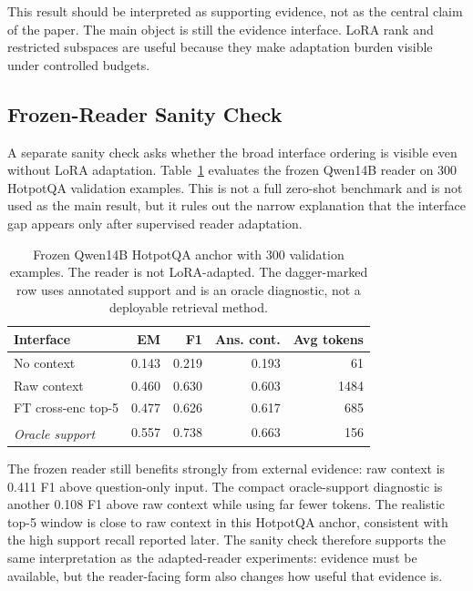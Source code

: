 \documentclass[a4paper,fleqn]{cas-sc}
\newcommand{\diagiface}[1]{\emph{#1}\textsuperscript{\dag}}
\begin{document}
This result should be interpreted as supporting evidence, not as the central
claim of the paper. The main object is still the evidence interface. LoRA rank
and restricted subspaces are useful because they make adaptation burden visible
under controlled budgets.

\subsection{Frozen-Reader Sanity Check}

A separate sanity check asks whether the broad interface ordering is visible
even without LoRA adaptation. Table~\ref{tab:frozen-qwen14b-sanity} evaluates
the frozen Qwen14B reader on 300 HotpotQA validation examples. This is not a
full zero-shot benchmark and is not used as the main result, but it rules out
the narrow explanation that the interface gap appears only after supervised
reader adaptation.

\begin{table}[!t]
\centering
\caption{Frozen Qwen14B HotpotQA anchor with 300 validation examples. The
reader is not LoRA-adapted. The dagger-marked row uses annotated support and is
an oracle diagnostic, not a deployable retrieval method.}
\label{tab:frozen-qwen14b-sanity}
\small
\setlength{\tabcolsep}{4pt}
\begin{tabular}{lrrrr}
\toprule
Interface & EM & F1 & Ans. cont. & Avg tokens \\
\midrule
No context & 0.143 & 0.219 & 0.193 & 61 \\
Raw context & 0.460 & 0.630 & 0.603 & 1484 \\
FT cross-enc top-5 & 0.477 & 0.626 & 0.617 & 685 \\
\diagiface{Oracle support} & 0.557 & 0.738 & 0.663 & 156 \\
\bottomrule
\end{tabular}
\end{table}

The frozen reader still benefits strongly from external evidence: raw context
is 0.411 F1 above question-only input. The compact oracle-support diagnostic is
another 0.108 F1 above raw context while using far fewer tokens. The realistic
top-5 window is close to raw context in this HotpotQA anchor, consistent with
the high support recall reported later. The sanity check therefore supports
the same interpretation as the adapted-reader experiments: evidence must be
available, but the reader-facing form also changes how useful that evidence is.
\end{document}
